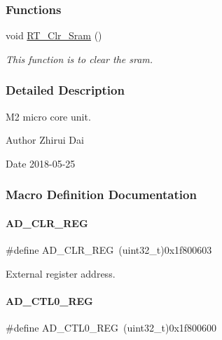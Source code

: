\subsubsection*{Functions}
\begin{DoxyCompactItemize}
\item 
void \mbox{\hyperlink{a00020_a42674a2ca7d088e68de4e2aa81ec597c}{R\+T\+\_\+\+Clr\+\_\+\+Sram}} ()
\begin{DoxyCompactList}\small\item\em This function is to clear the sram. \end{DoxyCompactList}\end{DoxyCompactItemize}


\subsubsection{Detailed Description}
M2 micro core unit. 

\begin{DoxyAuthor}{Author}
Zhirui Dai 
\end{DoxyAuthor}
\begin{DoxyDate}{Date}
2018-\/05-\/25 
\end{DoxyDate}


\subsubsection{Macro Definition Documentation}
\mbox{\label{a00020_a909cbad2fef284b18a87a5bb1395ef11}} 
\paragraph{\texorpdfstring{A\+D\+\_\+\+C\+L\+R\+\_\+\+R\+EG}{AD\_CLR\_REG}}
{\footnotesize\ttfamily \#define A\+D\+\_\+\+C\+L\+R\+\_\+\+R\+EG~(uint32\+\_\+t)0x1f800603}

External register address. \mbox{\label{a00020_a7c90725a1b307a000a44211bcb115a47}} 
\paragraph{\texorpdfstring{A\+D\+\_\+\+C\+T\+L0\+\_\+\+R\+EG}{AD\_CTL0\_REG}}
{\footnotesize\ttfamily \#define A\+D\+\_\+\+C\+T\+L0\+\_\+\+R\+EG~(uint32\+\_\+t)0x1f800600}

